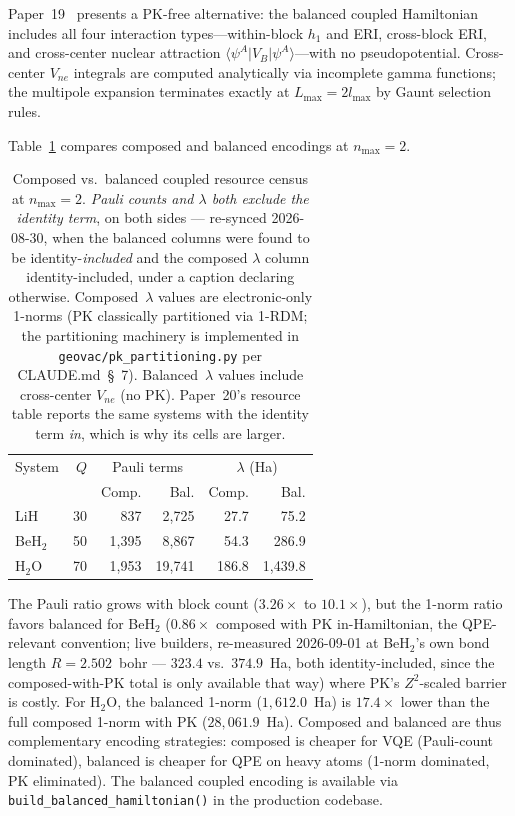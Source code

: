 \documentclass[aps,pra,twocolumn,superscriptaddress,longbibliography]{revtex4-2}
\begin{document}
Paper~19~\cite{loutey_paper19} presents a PK-free alternative: the
balanced coupled Hamiltonian includes all four interaction
types---within-block $h_1$ and ERI, cross-block ERI, and cross-center
nuclear attraction $\langle \psi^A | V_B | \psi^A \rangle$---with no
pseudopotential.  Cross-center $V_{ne}$ integrals are computed
analytically via incomplete gamma functions; the multipole expansion
terminates exactly at $L_{\max} = 2 l_{\max}$ by Gaunt selection
rules.

Table~\ref{tab:balanced} compares composed and balanced encodings
at $n_{\max} = 2$.

\begin{table}[t]
\caption{Composed vs.\ balanced coupled resource census at
$n_{\max} = 2$.  \emph{Pauli counts and $\lambda$ both exclude the
identity term}, on both sides --- re-synced 2026-08-30, when the balanced
columns were found to be identity-\emph{included} and the composed
$\lambda$ column identity-included, under a caption declaring otherwise.
Composed~$\lambda$ values are electronic-only 1-norms
(PK classically partitioned via 1-RDM; the partitioning machinery is
implemented in \texttt{geovac/pk\_partitioning.py} per CLAUDE.md~\S~7).
Balanced~$\lambda$ values include cross-center $V_{ne}$ (no PK).
Paper~20's resource table reports the same systems with the identity
term \emph{in}, which is why its cells are larger.}
\label{tab:balanced}
\begin{ruledtabular}
\begin{tabular}{lrrrrr}
System & $Q$ & \multicolumn{2}{c}{Pauli terms}
  & \multicolumn{2}{c}{$\lambda$ (Ha)} \\
  & & Comp. & Bal. & Comp. & Bal. \\
\hline
LiH     &  30 &    837 & 2{,}725 &  27.7 &   75.2 \\
BeH$_2$ &  50 &  1{,}395 & 8{,}867 &  54.3 &  286.9 \\
H$_2$O  &  70 &  1{,}953 & 19{,}741 & 186.8 & 1{,}439.8 \\
\end{tabular}
\end{ruledtabular}
\end{table}

The Pauli ratio grows with block count ($3.26\times$ to $10.1\times$),
but the 1-norm ratio favors balanced for BeH$_2$ ($0.86\times$
composed with PK in-Hamiltonian, the QPE-relevant convention; live
builders, re-measured 2026-09-01 at BeH$_2$'s own bond length
$R = 2.502$~bohr --- $323.4$ vs.\ $374.9$~Ha, both
identity-included, since the composed-with-PK total is only available
that way) where PK's $Z^2$-scaled barrier is costly.  For H$_2$O,
the balanced 1-norm ($1{,}612.0$~Ha) is $17.4\times$ lower than the
full composed 1-norm with PK ($28{,}061.9$~Ha).  Composed and balanced
are thus complementary encoding strategies: composed is cheaper for
VQE (Pauli-count dominated), balanced is cheaper for QPE on heavy
atoms (1-norm dominated, PK eliminated).  The balanced coupled
encoding is available via \texttt{build\_balanced\_hamiltonian()}
in the production codebase.
\end{document}
